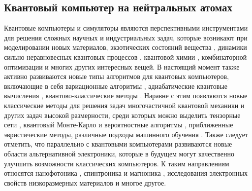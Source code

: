 \subsection{Квантовый компьютер на нейтральных атомах}

Квантовые компьютеры и симуляторы являются перспективными инструментами для решения сложных научных и индустриальных задач, которые возникают при моделировании новых материалов, экзотических состояний вещества \cite{Ebadi_2021,MBPColdAtoms, moire,google,Non_Abelian}, динамики сильно неравновесных квантовых процессов \cite{google,TimeCrystal_Monroe,KagomeIce}, квантовой химии \cite{QuantumChemistry}, комбинаторной оптимизации \cite{RydbergCombinatorial,Combinatorial} и многих других интересных вещей. В настоящий момент также активно развиваются новые типы алгоритмов для квантовых компьютеров, включающие в себя вариационные алгоритмы \cite{Variational}, адиабатические квантовые вычисления \cite{Adiabatic}, квантово-классические методы \cite{EnhancingVMC,QuantumClassical}. Наравне с этим появляются новые классические методы для решения задач многочастичной квантовой механики и других задач высокой размерности, среди которых можно выделить тензорные сети \cite{DMRG,TensorTrain,ITensor,perezgarcia2007matrix,DMRG_Intro}, квантовый Монте-Карло и вероятностные алгоритмы \cite{SSE,Kosztin_1996}, приближенные эвристические методы, различные подходы машинного обучения \cite{AlphaFold,AlphaGo,NNQS}. Также следует отметить, что параллельно с квантовыми компьютерами развиваются новые области альтернативной электроники, которые в будущем могут качественно улучшить возможности классических компьютеров. К таким направлениям относятся нанофотоника \cite{IntegratedPhotonics,NeuromorphicPhotonics}, спинтроника и магноника \cite{spintronics,spintronics_topo}, исследования электронных свойств низкоразмерных материалов \cite{graphene_transistors} и многое другое. 

